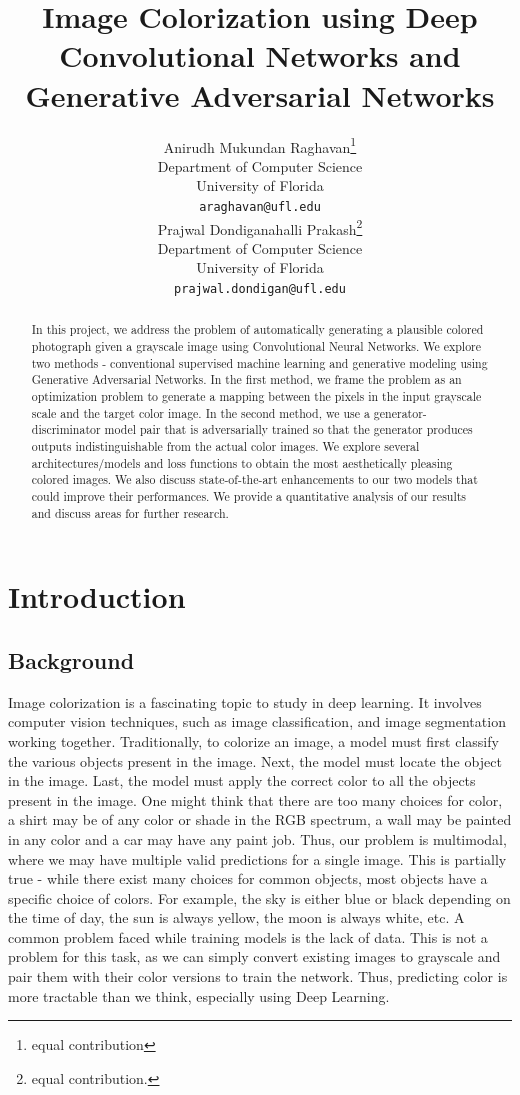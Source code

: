\documentclass{article}
\title{Image Colorization using Deep Convolutional Networks and Generative Adversarial Networks}
\author{%
  Anirudh Mukundan Raghavan\thanks{equal contribution}\\
  Department of Computer Science\\
  University of Florida\\
  \texttt{araghavan@ufl.edu} \\
  \And
  Prajwal Dondiganahalli Prakash\thanks{equal contribution.}\\
  Department of Computer Science\\
  University of Florida\\
  \texttt{prajwal.dondigan@ufl.edu} \\
}
\begin{document}
\maketitle

\begin{abstract}
  In this project, we address the problem of automatically generating a
  plausible colored photograph given a grayscale image using Convolutional
  Neural Networks. We explore two methods - conventional supervised machine
  learning and generative modeling using Generative Adversarial Networks. In the
  first method, we frame the problem as an optimization problem to generate a
  mapping between the pixels in the input grayscale scale and the target color
  image. In the second method, we use a generator-discriminator model pair that
  is adversarially trained so that the generator produces outputs
  indistinguishable from the actual color images. We explore several
  architectures/models and loss functions to obtain the most aesthetically
  pleasing colored images. We also discuss state-of-the-art enhancements to our
  two models that could improve their performances. We provide a quantitative
  analysis of our results and discuss areas for further research.
\end{abstract}

\section{Introduction}

\subsection{Background}

Image colorization is a fascinating topic to study in deep learning. It involves
computer vision techniques, such as image classification, and image segmentation
working together. Traditionally, to colorize an image, a model must first
classify the various objects present in the image. Next, the model must locate
the object in the image. Last, the model must apply the correct color to all the
objects present in the image. One might think that there are too many choices
for color, a shirt may be of any color or shade in the RGB spectrum, a wall may
be painted in any color and a car may have any paint job. Thus, our problem is
multimodal, where we may have multiple valid predictions for a single image.
This is partially true - while there exist many choices for common objects, most
objects have a specific choice of colors. For example, the sky is either blue or
black depending on the time of day, the sun is always yellow, the moon is always
white, etc. A common problem faced while training models is the lack of data.
This is not a problem for this task, as we can simply convert existing images to
grayscale and pair them with their color versions to train the network. Thus,
predicting color is more tractable than we think, especially using Deep
Learning.
\end{document}
